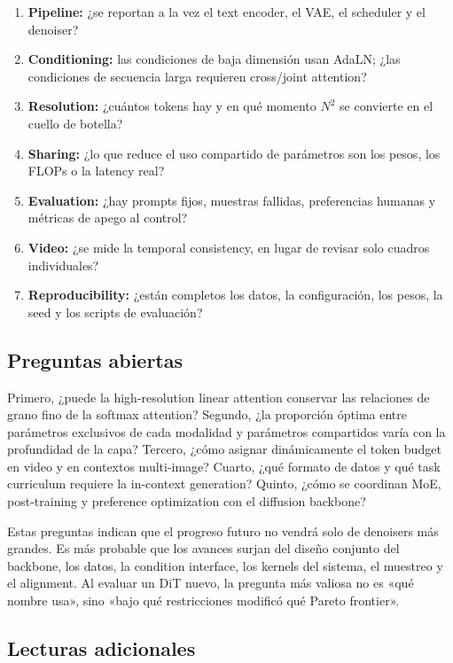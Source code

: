 \documentclass[a4paper]{article}
\begin{document}
\begin{enumerate}
  \item \textbf{Pipeline: }¿se reportan a la vez el text encoder, el VAE, el scheduler y el denoiser?
  \item \textbf{Conditioning: }las condiciones de baja dimensión usan AdaLN; ¿las condiciones de secuencia larga requieren cross/joint attention?
  \item \textbf{Resolution: }¿cuántos tokens hay y en qué momento $N^2$ se convierte en el cuello de botella?
  \item \textbf{Sharing: }¿lo que reduce el uso compartido de parámetros son los pesos, los FLOPs o la latency real?
  \item \textbf{Evaluation: }¿hay prompts fijos, muestras fallidas, preferencias humanas y métricas de apego al control?
  \item \textbf{Video: }¿se mide la temporal consistency, en lugar de revisar solo cuadros individuales?
  \item \textbf{Reproducibility: }¿están completos los datos, la configuración, los pesos, la seed y los scripts de evaluación?
\end{enumerate}

\subsection{Preguntas abiertas}

Primero, ¿puede la high-resolution linear attention conservar las relaciones de grano fino de la softmax attention? Segundo, ¿la proporción óptima entre parámetros exclusivos de cada modalidad y parámetros compartidos varía con la profundidad de la capa? Tercero, ¿cómo asignar dinámicamente el token budget en video y en contextos multi-image? Cuarto, ¿qué formato de datos y qué task curriculum requiere la in-context generation? Quinto, ¿cómo se coordinan MoE, post-training y preference optimization con el diffusion backbone?

Estas preguntas indican que el progreso futuro no vendrá solo de denoisers más grandes. Es más probable que los avances surjan del diseño conjunto del backbone, los datos, la condition interface, los kernels del sistema, el muestreo y el alignment. Al evaluar un DiT nuevo, la pregunta más valiosa no es «qué nombre usa», sino «bajo qué restricciones modificó qué Pareto frontier».

\subsection{Lecturas adicionales}
\end{document}
